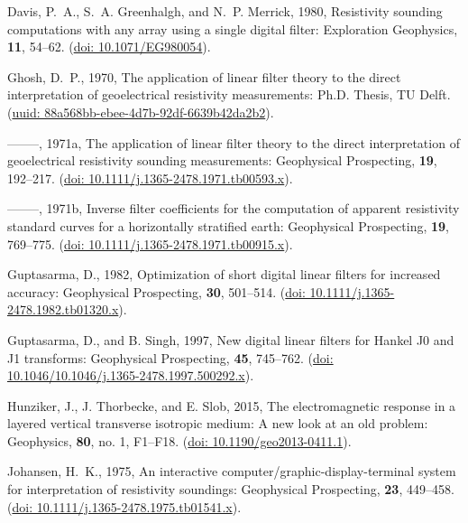\documentclass[a4paper, twoside, parskip, 10pt]{scrartcl}
\begin{document}
\begin{multicols}{2}
\begin{thebibliography}{}
Davis, P.~A., S.~A. Greenhalgh, and N.~P. Merrick,  1980, Resistivity sounding
  computations with any array using a single digital filter: Exploration
  Geophysics, {\bf 11}, 54--62.
\newblock (\href{https://doi.org/10.1071/EG980054}{doi: 10.1071/EG980054}).

Ghosh, D.~P.,  1970, The application of linear filter theory to the direct
  interpretation of geoelectrical resistivity measurements: {Ph.D. Thesis}, {TU
  Delft}.
\newblock
  (\href{http://resolver.tudelft.nl/uuid:88a568bb-ebee-4d7b-92df-6639b42da2b2}{uuid:
  88a568bb-ebee-4d7b-92df-6639b42da2b2}).

--------, 1971a, The application of linear filter theory to the direct
  interpretation of geoelectrical resistivity sounding measurements:
  Geophysical Prospecting, {\bf 19}, 192--217.
\newblock (\href{https://doi.org/10.1111/j.1365-2478.1971.tb00593.x}{doi:
  10.1111/j.1365-2478.1971.tb00593.x}).

--------, 1971b, Inverse filter coefficients for the computation of apparent
  resistivity standard curves for a horizontally stratified earth: Geophysical
  Prospecting, {\bf 19}, 769--775.
\newblock (\href{https://doi.org/10.1111/j.1365-2478.1971.tb00915.x}{doi:
  10.1111/j.1365-2478.1971.tb00915.x}).

Guptasarma, D.,  1982, Optimization of short digital linear filters for
  increased accuracy: Geophysical Prospecting, {\bf 30}, 501--514.
\newblock (\href{https://doi.org/10.1111/j.1365-2478.1982.tb01320.x}{doi:
  10.1111/j.1365-2478.1982.tb01320.x}).

Guptasarma, D., and B. Singh,  1997, New digital linear filters for {H}ankel
  {J}0 and {J}1 transforms: Geophysical Prospecting, {\bf 45}, 745--762.
\newblock (\href{https://doi.org/10.1046/j.1365-2478.1997.500292.x}{doi:
  10.1046/10.1046/j.1365-2478.1997.500292.x}).

Hunziker, J., J. Thorbecke, and E. Slob,  2015, The electromagnetic response in
  a layered vertical transverse isotropic medium: {A} new look at an old
  problem: Geophysics, {\bf 80}, no. 1, F1--F18.
\newblock (\href{https://doi.org/10.1190/geo2013-0411.1}{doi:
  10.1190/geo2013-0411.1}).

Johansen, H.~K.,  1975, An interactive computer/graphic-display-terminal system
  for interpretation of resistivity soundings: Geophysical Prospecting, {\bf
  23}, 449--458.
\newblock (\href{https://doi.org/10.1111/j.1365-2478.1975.tb01541.x}{doi:
  10.1111/j.1365-2478.1975.tb01541.x}).


\end{thebibliography}
\end{multicols}
\end{document}
